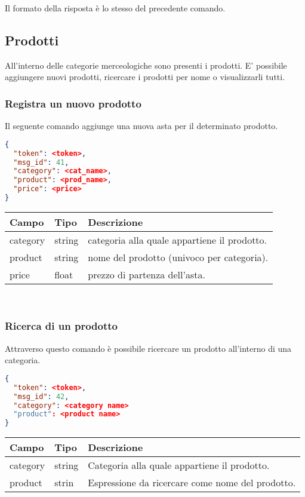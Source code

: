 Il formato della risposta è lo stesso del precedente comando.
\subsection{Prodotti}
All'interno delle categorie merceologiche sono presenti i prodotti. E' possibile aggiungere nuovi prodotti, ricercare i prodotti per nome o visualizzarli tutti.
\subsubsection{Registra un nuovo prodotto}
Il seguente comando aggiunge una nuova asta per il determinato prodotto.
\begin{lstlisting}[language=json]
{
  "token": <token>,
  "msg_id": 41,
  "category": <cat_name>,
  "product": <prod_name>,
  "price": <price>
}
\end{lstlisting}

\begin{tabular}{|l | l | l |}
\hline
Campo & Tipo & Descrizione \\ \hline
category & string & categoria alla quale appartiene il prodotto. \\ \hline
product & string & nome del prodotto (univoco per categoria).\\ \hline
price & float & prezzo di partenza dell'asta.\\ \hline
\end{tabular} \\

\subsubsection{Ricerca di un prodotto}
Attraverso questo comando è possibile ricercare un prodotto all'interno di una categoria.
\begin{lstlisting}[language=json]
{
  "token": <token>,
  "msg_id": 42,
  "category": <category name>
  "product": <product name>
}
\end{lstlisting}

\begin{tabular}{|l | l | l |}
\hline
Campo & Tipo & Descrizione \\ \hline
category & string & Categoria alla quale appartiene il prodotto. \\ \hline
product & strin & Espressione da ricercare come nome del prodotto.\\ \hline
\end{tabular} \\
